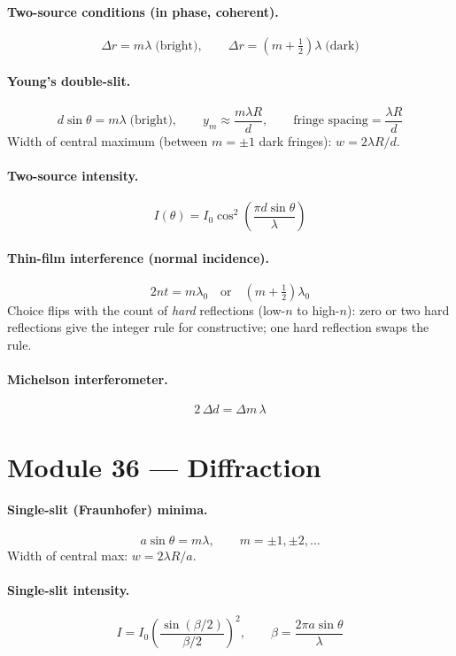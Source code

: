 \documentclass[11pt]{article}
\begin{document}
\paragraph{Two-source conditions (in phase, coherent).}
\[
\Delta r = m\lambda \;\text{(bright)},
\qquad
\Delta r = (m+\tfrac{1}{2})\lambda \;\text{(dark)}
\]

\paragraph{Young's double-slit.}
\[
d\sin\theta = m\lambda \;\text{(bright)},
\qquad
y_m \approx \frac{m\lambda R}{d},
\qquad
\text{fringe spacing} = \frac{\lambda R}{d}
\]
Width of central maximum (between $m=\pm 1$ dark fringes): $w = 2\lambda R/d$.

\paragraph{Two-source intensity.}
\[
I(\theta) = I_0\cos^2\!\left(\frac{\pi d\sin\theta}{\lambda}\right)
\]

\paragraph{Thin-film interference (normal incidence).}
\[
2 n t = m\lambda_0 \quad\text{or}\quad (m+\tfrac{1}{2})\lambda_0
\]
Choice flips with the count of \emph{hard} reflections (low-$n$ to high-$n$): zero or two hard reflections give the integer rule for constructive; one hard reflection swaps the rule.

\paragraph{Michelson interferometer.}
\[
2\,\Delta d = \Delta m\,\lambda
\]

\section*{Module 36 --- Diffraction}

\paragraph{Single-slit (Fraunhofer) minima.}
\[
a\sin\theta = m\lambda,\qquad m = \pm 1,\pm 2,\dots
\]
Width of central max: $w = 2\lambda R/a$.

\paragraph{Single-slit intensity.}
\[
I = I_0\!\left(\frac{\sin(\beta/2)}{\beta/2}\right)^{\!2},
\qquad
\beta = \frac{2\pi a\sin\theta}{\lambda}
\]
\end{document}
